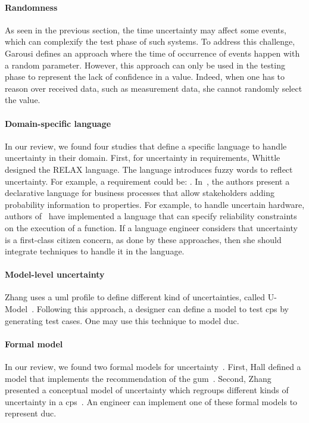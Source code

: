 \paragraph{Randomness}
As seen in the previous section, the time uncertainty may affect some events, which can complexify the test phase of such systems.
To address this challenge, Garousi \etal \cite{DBLP:conf/icst/Garousi08} defines an approach where the time of occurrence of events happen with a random parameter.
However, this approach can only be used in the testing phase to represent the lack of confidence in a value.
Indeed, when one has to reason over received data, such as measurement data, she cannot randomly select the value.
	
\paragraph{Domain-specific language}
In our review, we found four studies that define a specific language to handle uncertainty in their domain.
First, for uncertainty in requirements, Whittle \etal \cite{DBLP:journals/re/WhittleSBCB10, DBLP:conf/re/WhittleSBCB09} designed the RELAX language.
The language introduces fuzzy words to reflect uncertainty.
For example, a requirement could be: .
In~\cite{DBLP:journals/infsof/Jimenez-RamirezW0V15}, the authors present a declarative language for business processes that allow stakeholders adding probability information to properties.
For example, to handle uncertain hardware, authors of~\cite{DBLP:conf/oopsla/CarbinMR13} have implemented a language that can specify reliability constraints on the execution of a function.
If a language engineer considers that uncertainty is a first-class citizen concern, as done by these approaches, then she should integrate techniques to handle it in the language.
	
\paragraph{Model-level uncertainty}
Zhang \etal \cite{DBLP:journals/sosym/Zhang00NO19} uses a \gls{uml} profile to define different kind of uncertainties, called U-Model~\cite{DBLP:conf/ecmdafa/ZhangSAYON16}.
Following this approach, a designer can define a model to test \gls{cps} by generating test cases.
One may use this technique to model \gls{duc}.
	
\paragraph{Formal model}
In our review, we found two formal models for uncertainty~\cite{DBLP:journals/csi/Hall06, DBLP:conf/ecmdafa/ZhangSAYON16}.
First, Hall \etal defined a model that implements the recommendation of the \gls{gum}~\cite{DBLP:journals/csi/Hall06}. 
Second, Zhang \etal presented a conceptual model of uncertainty which regroups different kinds of uncertainty in a \gls{cps}~\cite{DBLP:conf/ecmdafa/ZhangSAYON16}.
An engineer can implement one of these formal models to represent \gls{duc}.
	
